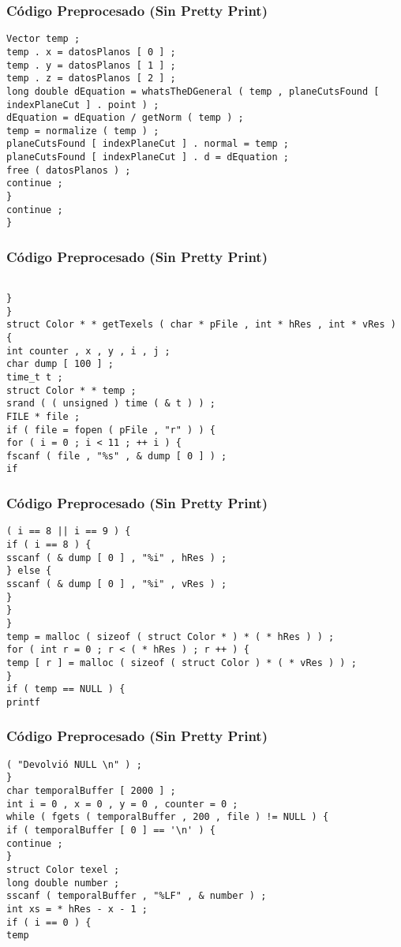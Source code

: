 \documentclass{beamer}
\begin{document}
\begin{frame}[fragile]
\frametitle{C\'odigo Preprocesado (Sin Pretty Print)}
\begin{lstlisting}[style=CStyle]
Vector temp ; 
temp . x = datosPlanos [ 0 ] ; 
temp . y = datosPlanos [ 1 ] ; 
temp . z = datosPlanos [ 2 ] ; 
long double dEquation = whatsTheDGeneral ( temp , planeCutsFound [ indexPlaneCut ] . point ) ; 
dEquation = dEquation / getNorm ( temp ) ; 
temp = normalize ( temp ) ; 
planeCutsFound [ indexPlaneCut ] . normal = temp ; 
planeCutsFound [ indexPlaneCut ] . d = dEquation ; 
free ( datosPlanos ) ; 
continue ; 
} 
continue ; 
} \end{lstlisting}
\end{frame}
\begin{frame}[fragile]
\frametitle{C\'odigo Preprocesado (Sin Pretty Print)}
\begin{lstlisting}[style=CStyle]

} 
} 
struct Color * * getTexels ( char * pFile , int * hRes , int * vRes ) { 
int counter , x , y , i , j ; 
char dump [ 100 ] ; 
time_t t ; 
struct Color * * temp ; 
srand ( ( unsigned ) time ( & t ) ) ; 
FILE * file ; 
if ( file = fopen ( pFile , "r" ) ) { 
for ( i = 0 ; i < 11 ; ++ i ) { 
fscanf ( file , "%s" , & dump [ 0 ] ) ; 
if \end{lstlisting}
\end{frame}
\begin{frame}[fragile]
\frametitle{C\'odigo Preprocesado (Sin Pretty Print)}
\begin{lstlisting}[style=CStyle]
( i == 8 || i == 9 ) { 
if ( i == 8 ) { 
sscanf ( & dump [ 0 ] , "%i" , hRes ) ; 
} else { 
sscanf ( & dump [ 0 ] , "%i" , vRes ) ; 
} 
} 
} 
temp = malloc ( sizeof ( struct Color * ) * ( * hRes ) ) ; 
for ( int r = 0 ; r < ( * hRes ) ; r ++ ) { 
temp [ r ] = malloc ( sizeof ( struct Color ) * ( * vRes ) ) ; 
} 
if ( temp == NULL ) { 
printf \end{lstlisting}
\end{frame}
\begin{frame}[fragile]
\frametitle{C\'odigo Preprocesado (Sin Pretty Print)}
\begin{lstlisting}[style=CStyle]
( "Devolvió NULL \n" ) ; 
} 
char temporalBuffer [ 2000 ] ; 
int i = 0 , x = 0 , y = 0 , counter = 0 ; 
while ( fgets ( temporalBuffer , 200 , file ) != NULL ) { 
if ( temporalBuffer [ 0 ] == '\n' ) { 
continue ; 
} 
struct Color texel ; 
long double number ; 
sscanf ( temporalBuffer , "%LF" , & number ) ; 
int xs = * hRes - x - 1 ; 
if ( i == 0 ) { 
temp \end{lstlisting}
\end{frame}
\end{document}
